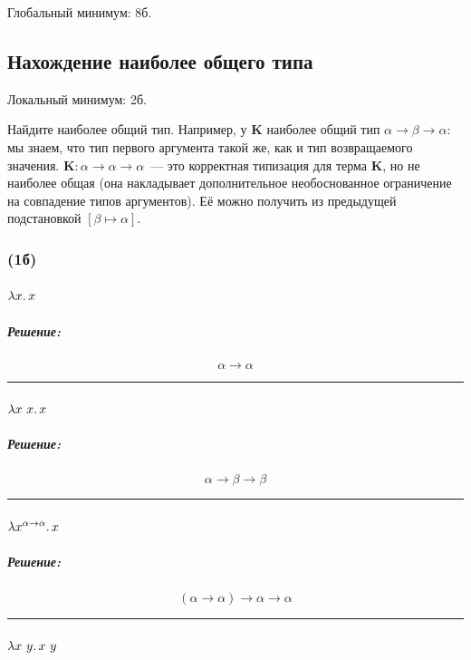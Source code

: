 \documentclass{article}
\newenvironment{proof}{\subparagraph{\hspace{-1em}Решение:\newline}}{\par\noindent\rule{\textwidth}{0.4pt}}
\newcommand{\term}[1]{\mathbf{#1}}
\newcommand{\ap}{~}
\newcommand{\subst}[3]{\left[#2 \mapsto #3 \right] #1}
\begin{document}
    Глобальный минимум: 8б.

    \subsection{Нахождение наиболее общего типа}

    Локальный минимум: 2б.

    Найдите наиболее общий тип.
    Например, у $\term{K}$ наиболее общий тип $\alpha \to \beta \to \alpha$: мы знаем, что тип первого аргумента такой же, как и тип возвращаемого значения.
    $\term{K} : \alpha \to \alpha \to \alpha$~--- это корректная типизация
    для терма $\term{K}$, но не наиболее общая (она накладывает дополнительное необоснованное ограничение на совпадение типов аргументов).
    Её можно получить из предыдущей подстановкой $\subst{}{\beta}{\alpha}$.

    \subsubsection{(1б)}

    \paragraph{} $\lambda x\ldotp x$

    \begin{proof}
        \[
            \alpha \to \alpha
        \]
    \end{proof}

    \paragraph{} $\lambda x~x\ldotp x$

    \begin{proof}
        \[
            \alpha \to \beta \to \beta
        \]
    \end{proof}

    \paragraph{} $\lambda x^{\alpha \to \alpha}\ldotp x$

    \begin{proof}
        \[
            (\alpha \to \alpha) \to \alpha \to \alpha
        \]
    \end{proof}

    \paragraph{} $\lambda x~y\ldotp x \ap y$
\end{document}
